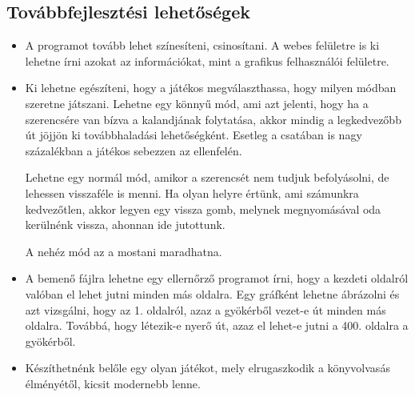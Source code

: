 \documentclass[12pt,a4paper,oneside]{report}
\begin{document}
  \subsection{Továbbfejlesztési lehetőségek}
  \begin{itemize}
    \item A programot tovább lehet színesíteni, csinosítani. A webes
      felületre is ki lehetne írni azokat az információkat, mint a
      grafikus felhasználói felületre.
    \item Ki lehetne egészíteni, hogy a játékos megválaszthassa, hogy
      milyen módban szeretne játszani. Lehetne egy könnyű mód, ami azt
      jelenti, hogy ha a szerencsére van bízva a kalandjának
      folytatása, akkor mindig a legkedvezőbb út jöjjön ki
      továbbhaladási lehetőségként. Esetleg a csatában is nagy
      százalékban a játékos sebezzen az ellenfelén.

      Lehetne egy normál mód, amikor a szerencsét nem tudjuk
      befolyásolni, de lehessen visszaféle is menni. Ha olyan helyre
      értünk, ami számunkra kedvezőtlen, akkor legyen egy vissza gomb,
      melynek megnyomásával oda kerülnénk vissza, ahonnan ide
      jutottunk.

      A nehéz mód az a mostani maradhatna.
    \item A bemenő fájlra lehetne egy ellernőrző programot írni, hogy
      a kezdeti oldalról valóban el lehet jutni minden más
      oldalra. Egy gráfként lehetne ábrázolni és azt vizsgálni, hogy
      az 1. oldalról, azaz a gyökérből vezet-e út minden más
      oldalra. Továbbá, hogy létezik-e nyerő út, azaz el lehet-e jutni
      a 400. oldalra a gyökérből.
    \item Készíthetnénk belőle egy olyan játékot, mely elrugaszkodik a
      könyvolvasás élményétől, kicsit modernebb lenne.
  \end{itemize}
\end{document}
